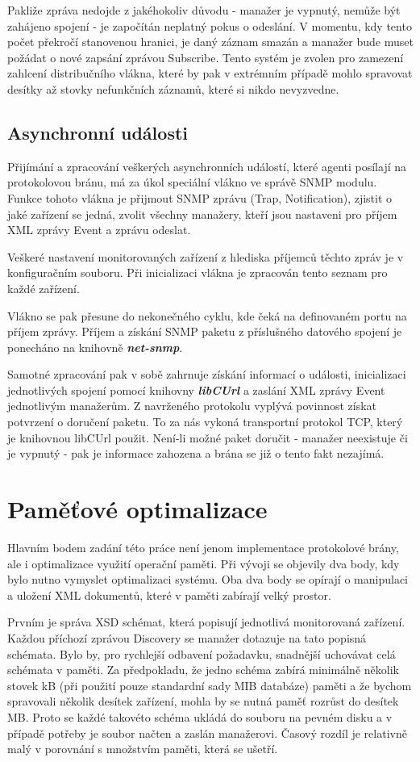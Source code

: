 Pakliže zpráva nedojde z jakéhokoliv důvodu - manažer je vypnutý, nemůže být zahájeno spojení - je započítán neplatný pokus o odeslání. V momentu, kdy tento počet
překročí stanovenou hranici, je daný záznam smazán a manažer bude muset požádat o nové zapsání zprávou Subscribe. Tento systém je zvolen pro zamezení zahlcení 
distribučního vlákna, které by pak v extrémním případě mohlo spravovat desítky až stovky nefunkčních záznamů, které si nikdo nevyzvedne.


\subsection{Asynchronní události}
Přijímání a zpracování veškerých asynchronních událostí, které agenti posílají na protokolovou bránu, má za úkol speciální vlákno ve správě SNMP modulu.
Funkce tohoto vlákna je přijmout SNMP zprávu (Trap, Notification), zjistit o jaké zařízení se jedná, zvolit všechny manažery, kteří jsou nastaveni pro příjem
XML zprávy Event a zprávu odeslat.

Veškeré nastavení monitorovaných zařízení z hlediska příjemců těchto zpráv je v konfiguračním souboru. Při inicializaci vlákna je zpracován tento seznam pro každé
zařízení.

Vlákno se pak přesune do nekonečného cyklu, kde čeká na definovaném portu na příjem zprávy. Příjem a získání SNMP paketu z příslušného datového spojení je ponecháno
na knihovně \textbf{\textit{net-snmp}}.

Samotné zpracování pak v sobě zahrnuje získání informací o události, inicializaci jednotlivých spojení pomocí knihovny \textbf{\textit{libCUrl}} a zaslání XML zprávy
Event jednotlivým manažerům. Z navrženého protokolu vyplývá povinnost získat potvrzení o doručení paketu. To za nás vykoná transportní protokol TCP, který je knihovnou libCUrl
použit. Není-li možné paket doručit - manažer neexistuje či je vypnutý - pak je informace zahozena a brána se již o tento fakt nezajímá.


\section{Paměťové optimalizace}
Hlavním bodem zadání této práce není jenom implementace protokolové brány, ale i optimalizace využití operační paměti. Při vývoji se objevily dva body, kdy bylo nutno 
vymyslet optimalizaci systému. Oba dva body se opírají o manipulaci a uložení XML dokumentů, které v paměti zabírají velký prostor.

Prvním je správa XSD schémat, která popisují jednotlivá monitorovaná zařízení. Každou příchozí zprávou Discovery se manažer dotazuje na tato popisná schémata. Bylo by, pro 
rychlejší odbavení požadavku, snadnější uchovávat celá schémata v paměti. Za předpokladu, že jedno schéma zabírá minimálně několik stovek kB (při použití pouze standardní
sady MIB databáze) paměti a že bychom spravovali několik desítek zařízení, mohla by se nutná paměť rozrůst do desítek MB. Proto se každé takovéto schéma ukládá do
souboru na pevném disku a v případě potřeby je soubor načten a zaslán manažerovi. Časový rozdíl je relativně malý v porovnání s množstvím paměti, která se ušetří.

